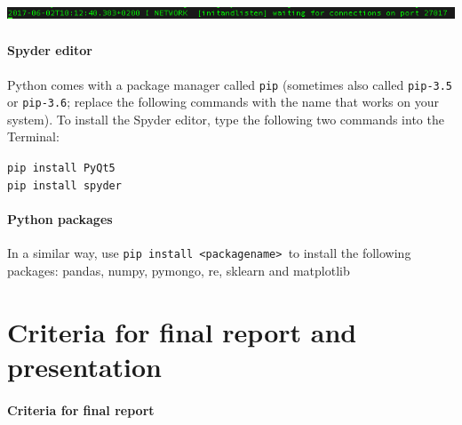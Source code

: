 \documentclass[a4paper]{report}
\begin{document}
\noindent\includegraphics[width=6.4953in,height=0.1783in]{Syllabus-img6.png} 

\paragraph{Spyder editor}
Python comes with a package manager called \small\texttt{pip} (sometimes also
called \small\texttt{pip-3.5} or \small\texttt{pip-3.6}; replace the following commands with
the name that works on your system). To install the Spyder editor,
type the following two commands into the Terminal: 

\noindent\small\texttt{pip install PyQt5}
\\
\small\texttt{pip install spyder}

\paragraph{Python packages}
In a similar way, use \small\texttt{pip install
{\textless}packagename{\textgreater} }to install the following
packages: pandas, numpy, pymongo, re, sklearn and matplotlib 



\section*{Criteria for final report and presentation}

\paragraph{Criteria for final report}
\end{document}

